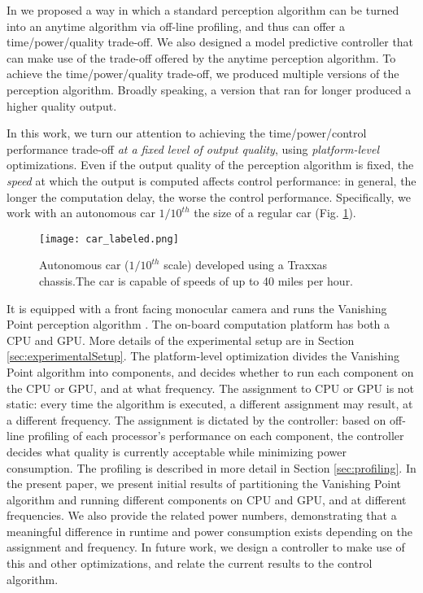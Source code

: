 In \cite{RTSS15} we proposed a way in which a standard perception algorithm can be turned into an anytime algorithm via off-line profiling, and thus can offer a time/power/quality trade-off.
We also designed a model predictive controller that can make use of the trade-off offered by the anytime perception algorithm.
To achieve the time/power/quality trade-off, we produced multiple versions of the perception algorithm.
Broadly speaking, a version that ran for longer produced a higher quality output. 

In this work, we turn our attention to achieving the time/power/control performance trade-off \emph{at a fixed level of output quality}, using \emph{platform-level} optimizations.
Even if the output quality of the perception algorithm is fixed, the \emph{speed} at which the output is computed affects control performance: in general, the longer the computation delay, the worse the control performance.
Specifically, we work with an autonomous car $1/10^{th}$ the size of a regular car (Fig. \ref{fig:traxxas}).
\begin{figure}[t]
	\centering
	\texttt{[image: car\_labeled.png]}
	\caption{Autonomous car ($1/10^{th}$ scale) developed using a Traxxas chassis.The car is capable of speeds of up to 40 miles per hour.}
		\label{fig:traxxas}
\end{figure}  
It is equipped with a front facing monocular camera and runs the Vanishing Point perception algorithm \cite{VP1}. 
The on-board computation platform has both a CPU and GPU. 
More details of the experimental setup are in Section \ref{sec:experimentalSetup}.
The platform-level optimization divides the Vanishing Point algorithm into components, and decides whether to run each component on the CPU or GPU, and at what frequency.
The assignment to CPU or GPU is not static: every time the algorithm is executed, a different assignment may result, at a different frequency.
The assignment is dictated by the controller: based on off-line profiling of each processor's performance on each component, the controller decides what quality is currently acceptable while minimizing power consumption. 
The profiling is described in more detail in Section \ref{sec:profiling}.
In the present paper, we present initial results of partitioning the Vanishing Point algorithm and running different components on CPU and GPU, and at different frequencies.
We also provide the related power numbers, demonstrating that a meaningful difference in runtime and power consumption exists depending on the assignment and frequency.
In future work, we design a controller to make use of this and other optimizations, and relate the current results to the control algorithm.

